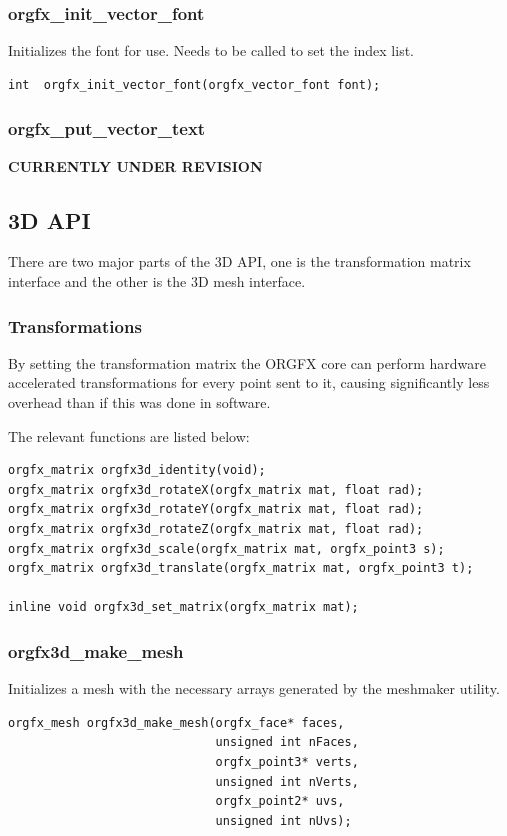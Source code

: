 \documentclass[10pt,a4paper]{article}
\begin{document}
\subsubsection{orgfx\_init\_vector\_font}
Initializes the font for use. Needs to be called to set the index list.
\begin{lstlisting}
int  orgfx_init_vector_font(orgfx_vector_font font);
\end{lstlisting}

\subsubsection{orgfx\_put\_vector\_text}
\textbf{CURRENTLY UNDER REVISION}


\subsection{3D API}
There are two major parts of the 3D API, one is the transformation matrix interface and the other is the 3D mesh interface.

\subsubsection{Transformations}
By setting the transformation matrix the ORGFX core can perform hardware accelerated transformations for every point sent to it, causing significantly less overhead than if this was done in software.

The relevant functions are listed below:

\begin{lstlisting}
orgfx_matrix orgfx3d_identity(void);
orgfx_matrix orgfx3d_rotateX(orgfx_matrix mat, float rad);
orgfx_matrix orgfx3d_rotateY(orgfx_matrix mat, float rad);
orgfx_matrix orgfx3d_rotateZ(orgfx_matrix mat, float rad);
orgfx_matrix orgfx3d_scale(orgfx_matrix mat, orgfx_point3 s);
orgfx_matrix orgfx3d_translate(orgfx_matrix mat, orgfx_point3 t);

inline void orgfx3d_set_matrix(orgfx_matrix mat);
\end{lstlisting}

\subsubsection{orgfx3d\_make\_mesh}
Initializes a mesh with the necessary arrays generated by the meshmaker utility.

\begin{lstlisting}
orgfx_mesh orgfx3d_make_mesh(orgfx_face* faces,
                             unsigned int nFaces,
                             orgfx_point3* verts,
                             unsigned int nVerts,
                             orgfx_point2* uvs,
                             unsigned int nUvs);
\end{lstlisting}
\end{document}
